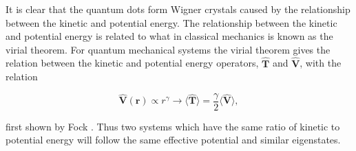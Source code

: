 	It is clear that the quantum dots form Wigner crystals caused by the relationship between the kinetic and potential energy. The relationship between the kinetic and potential energy is related to what in classical mechanics is known as the virial theorem. For quantum mechanical systems the virial theorem gives the relation between the kinetic and potential energy operators, $\hat{\mathbf{T}}$ and $\hat{\mathbf{V}}$, with the relation
	
	\begin{equation}
		\hat{\mathbf{V}}(\mathbf{r}) \propto r^{\gamma} \rightarrow \langle \hat{\mathbf{T}} \rangle = \frac{\gamma}{2} \langle \hat{\mathbf{V}} \rangle,
	\end{equation}
	
	first shown by Fock \cite{fock1930bemerkung}. Thus two systems which have the same ratio of kinetic to potential energy will follow the same effective potential and similar eigenstates.
	\clearpage


